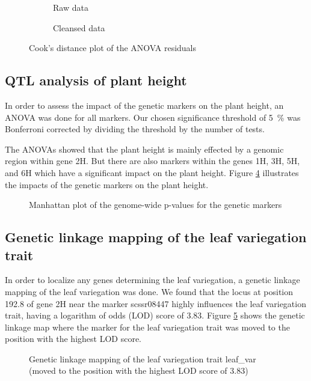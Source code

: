 \begin{figure}[htbp]
    \begin{subfigure}[t]{.48\textwidth}
        
        \caption{Raw data}
        \label{fig:raw_aov_height_residuals_cooks_dist}
    \end{subfigure}
    \begin{subfigure}[t]{.48\textwidth}
        
        \caption{Cleansed data}
        \label{fig:clean_aov_height_residuals_cooks_dist}
    \end{subfigure}
    \caption{Cook's distance plot of the ANOVA residuals}
    \label{fig:aov_height_residuals_cooks_dist}
\end{figure}

\subsection{QTL analysis of plant height}

In order to assess the impact of the genetic markers on the plant height, an ANOVA was done for all markers. Our chosen significance threshold of \qty{5}{\percent} was Bonferroni corrected by dividing the threshold by the number of tests.

The ANOVAs showed that the plant height is mainly effected by a genomic region within gene 2H. But there are also markers within the genes 1H, 3H, 5H, and 6H which have a significant impact on the plant height. Figure \ref{fig:clean_height_marker_effects_manhattan} illustrates the impacts of the genetic markers on the plant height.

\begin{figure}[htbp]
    
    \caption{Manhattan plot of the genome-wide p-values for the genetic markers}
    \label{fig:clean_height_marker_effects_manhattan}
\end{figure}

\subsection{Genetic linkage mapping of the leaf variegation trait}

In order to localize any genes determining the leaf variegation, a genetic linkage mapping of the leaf variegation was done. We found that the locus at position \num{192.8} of gene 2H near the marker scssr08447 highly influences the leaf variegation trait, having a logarithm of odds (LOD) score of \num{3.83}. Figure \ref{fig:link_map_leaf_variegation} shows the genetic linkage map where the marker for the leaf variegation trait was moved to the position with the highest LOD score.

\begin{figure}[htbp]
    
    \caption{Genetic linkage mapping of the leaf variegation trait leaf\_var (moved to the position with the highest LOD score of \num{3.83})}
    \label{fig:link_map_leaf_variegation}
\end{figure}